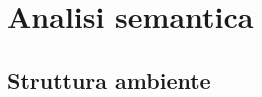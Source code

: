 \documentclass[../report.tex]{subfiles}
\begin{document}
\chapter{Analisi semantica}\label{c:analisi-semantica}
\section{Struttura ambiente}\label{s:struttura-ambiente}
\end{document}
